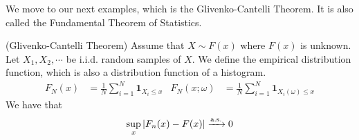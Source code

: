 \documentclass{huhtakm-template-book}
\begin{document}
    We move to our next examples, which is the Glivenko-Cantelli Theorem. It is also called the Fundamental Theorem of Statistics.
    \begin{thm}(Glivenko-Cantelli Theorem)
        Assume that $X\sim F(x)$ where $F(x)$ is unknown. Let $X_{1},X_{2},\cdots$ be i.i.d. random samples of $X$. We define the empirical distribution function, which is also a distribution function of a histogram.
        \begin{align*}
            F_{N}(x)&=\frac{1}{N}\sum_{i=1}^{N}\mathbf{1}_{X_{i}\leq x} & F_{N}(x;\omega)&=\frac{1}{N}\sum_{i=1}^{N}\mathbf{1}_{X_{i}(\omega)\leq x}
        \end{align*}
        We have that
        \begin{equation*}
            \sup_{x}\left|{F_{n}(x)-F(x)}\right|\xrightarrow{\text{a.s.}}0
        \end{equation*}
    \end{thm}
\end{document}
